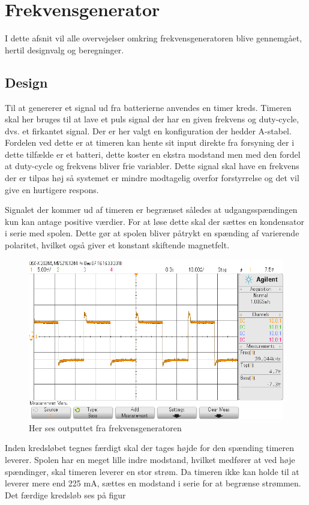 \section{Frekvensgenerator}\label{sec:frekv_gen}
I dette afsnit vil alle overvejelser omkring frekvensgeneratoren blive gennemgået, hertil designvalg og beregninger. 
\subsection{Design}
Til at genererer et signal ud fra batterierne anvendes en timer kreds. 
Timeren skal her bruges til at lave et puls signal der har en given frekvens og duty-cycle, dvs. et firkantet signal. 
Der er her valgt en konfiguration der hedder A-stabel. 
Fordelen ved dette er at timeren kan hente sit input direkte fra forsyning der i dette tilfælde er et batteri, dette koster en ekstra modstand men med den fordel at duty-cycle og frekvens bliver frie variabler. 
Dette signal skal have en frekvens der er tilpas høj så systemet er mindre modtagelig overfor forstyrrelse og det vil give en hurtigere respons. 

Signalet der kommer ud af timeren er begrænset således at udgangsspændingen kun kan antage positive værdier.
For at løse dette skal der sættes en kondensator i serie med spolen.
Dette gør at spolen bliver påtrykt en spænding af varierende polaritet, hvilket også giver et konstant skiftende magnetfelt.

\begin{figure}[h!]
	\centering
	\includegraphics[width=1\textwidth]{billeder/freq_png.png}
	\caption{Her ses outputtet fra frekvensgeneratoren}
	\label{fig:frekvensgenerator}
\end{figure}

Inden kredsløbet tegnes færdigt skal der tages højde for den spænding timeren leverer. 
Spolen har en meget lille indre modstand, hvilket medfører at ved høje spændinger, skal timeren leverer en stor strøm. 
Da timeren ikke kan holde til at leverer mere end 225 \si{\milli\ampere}, sættes en modstand i serie for at begrænse strømmen. 
Det færdige kredsløb ses på figur 

